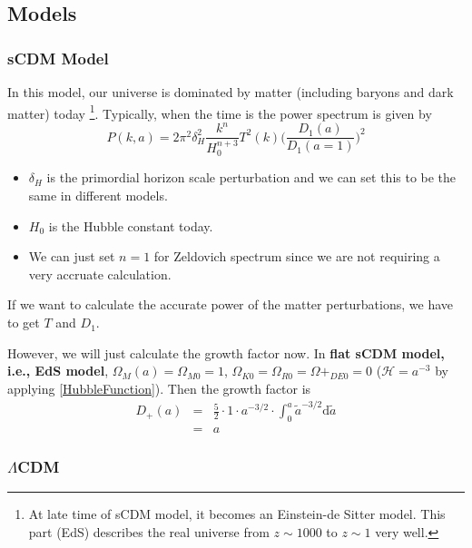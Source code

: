 \documentclass{article}
\begin{document}
\subsection{Models}
\subsubsection{sCDM Model}

In this model, our universe is dominated by matter (including baryons and dark matter) today {\footnote{
At late time of sCDM model, it becomes an Einstein-de Sitter model. This part (EdS) describes the real universe from $z\sim 1000$ to $z\sim 1$ very well.
}}. Typically, when the time is the power spectrum is given by
\begin{equation}
P(k,a)=2\pi^2\delta_H^2\frac{k^n}{H_0^{n+3}}T^2(k)\bigg(\frac{D_1(a)}{D_1(a=1)}\bigg)^2
\end{equation}


\begin{itemize}

\item 
$\delta_H$ is the primordial horizon scale perturbation and we can set this to be the same in different models.

\item 
$H_0$ is the Hubble constant today.

\item
We can just set $n=1$ for Zeldovich spectrum since we are not requiring a very accruate calculation.

\end{itemize}




If we want to calculate the accurate power of the matter perturbations, we have to get $T$ and $D_1$.

However, we will just calculate the growth factor now. 
In {\bf flat sCDM model, i.e., EdS model}, $\Omega_M(a)=\Omega_{M0}=1$, $\Omega_{K0}=\Omega_{R0}=\Omega+_{DE0}=0$ ($\mathscr H=a^{-3}$ by applying \ref{HubbleFunction}). Then the growth factor is
\begin{eqnarray}
D_+(a)
&=&\frac 5 2 \cdot 1 \cdot a^{-3/2} \cdot \int^a_0 {\tilde a}^{-3/2}\mathrm d \tilde a   \\
&=&a
\end{eqnarray}






\subsubsection{$\Lambda$CDM}
\end{document}
